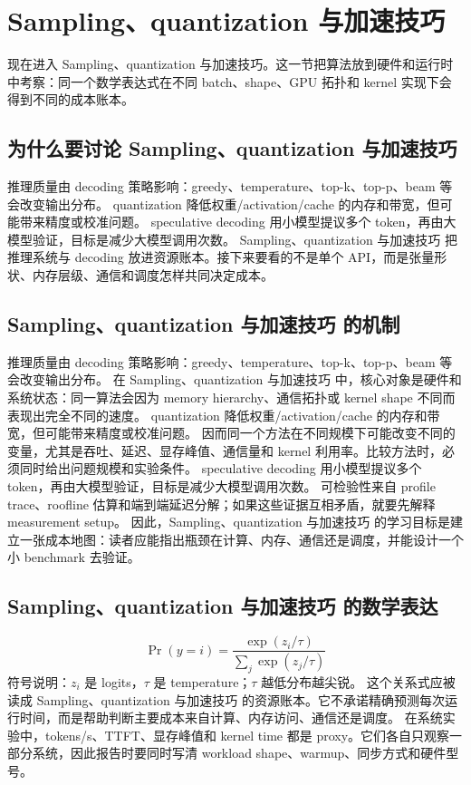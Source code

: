 \documentclass[a4paper]{article}
\begin{document}
\section{Sampling、quantization 与加速技巧}
现在进入 Sampling、quantization 与加速技巧。这一节把算法放到硬件和运行时中考察：同一个数学表达式在不同 batch、shape、GPU 拓扑和 kernel 实现下会得到不同的成本账本。
\subsection{为什么要讨论 Sampling、quantization 与加速技巧}
推理质量由 decoding 策略影响：greedy、temperature、top-k、top-p、beam 等会改变输出分布。
quantization 降低权重/activation/cache 的内存和带宽，但可能带来精度或校准问题。
speculative decoding 用小模型提议多个 token，再由大模型验证，目标是减少大模型调用次数。
Sampling、quantization 与加速技巧 把 推理系统与 decoding 放进资源账本。接下来要看的不是单个 API，而是张量形状、内存层级、通信和调度怎样共同决定成本。
\subsection{Sampling、quantization 与加速技巧 的机制}
推理质量由 decoding 策略影响：greedy、temperature、top-k、top-p、beam 等会改变输出分布。 在 Sampling、quantization 与加速技巧 中，核心对象是硬件和系统状态：同一算法会因为 memory hierarchy、通信拓扑或 kernel shape 不同而表现出完全不同的速度。
quantization 降低权重/activation/cache 的内存和带宽，但可能带来精度或校准问题。 因而同一个方法在不同规模下可能改变不同的变量，尤其是吞吐、延迟、显存峰值、通信量和 kernel 利用率。比较方法时，必须同时给出问题规模和实验条件。
speculative decoding 用小模型提议多个 token，再由大模型验证，目标是减少大模型调用次数。 可检验性来自 profile trace、roofline 估算和端到端延迟分解；如果这些证据互相矛盾，就要先解释 measurement setup。
因此，Sampling、quantization 与加速技巧 的学习目标是建立一张成本地图：读者应能指出瓶颈在计算、内存、通信还是调度，并能设计一个小 benchmark 去验证。
\subsection{Sampling、quantization 与加速技巧 的数学表达}
\[\Pr(y=i)=\frac{\exp(z_i/\tau)}{\sum_j\exp(z_j/\tau)}\]
符号说明：\(z_i\) 是 logits，\(\tau\) 是 temperature；\(\tau\) 越低分布越尖锐。
这个关系式应被读成 Sampling、quantization 与加速技巧 的资源账本。它不承诺精确预测每次运行时间，而是帮助判断主要成本来自计算、内存访问、通信还是调度。
在系统实验中，tokens/s、TTFT、显存峰值和 kernel time 都是 proxy。它们各自只观察一部分系统，因此报告时要同时写清 workload shape、warmup、同步方式和硬件型号。
\end{document}
